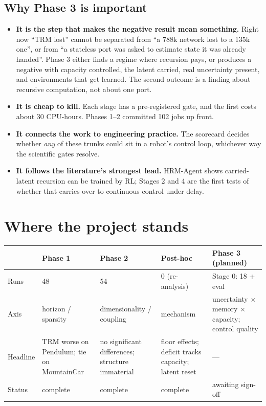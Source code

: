 \documentclass[11pt]{article}
\begin{document}
\subsection{Why Phase 3 is important}
\begin{itemize}
  \item \textbf{It is the step that makes the negative result mean something.} Right now ``TRM lost'' cannot be separated from ``a 788k network lost to a 135k one'', or from ``a stateless port was asked to estimate state it was already handed''. Phase 3 either finds a regime where recursion pays, or produces a negative with capacity controlled, the latent carried, real uncertainty present, and environments that get learned. The second outcome is a finding about recursive computation, not about one port.
  \item \textbf{It is cheap to kill.} Each stage has a pre-registered gate, and the first costs about 30 CPU-hours. Phases 1--2 committed 102 jobs up front.
  \item \textbf{It connects the work to engineering practice.} The scorecard decides whether \emph{any} of these trunks could sit in a robot's control loop, whichever way the scientific gates resolve.
  \item \textbf{It follows the literature's strongest lead.} HRM-Agent shows carried-latent recursion can be trained by RL; Stages 2 and 4 are the first tests of whether that carries over to continuous control under delay.
\end{itemize}

\section{Where the project stands}
\begin{table}[H]
\centering\small
\begin{tabularx}{\textwidth}{lYYYY}
\toprule
 & Phase 1 & Phase 2 & Post-hoc & Phase 3 (planned) \\
\midrule
Runs & 48 & 54 & 0 (re-analysis) & Stage 0: 18 + eval \\
Axis & horizon / sparsity & dimensionality / coupling & mechanism & uncertainty $\times$ memory $\times$ capacity; control quality \\
Headline & TRM worse on Pendulum; tie on MountainCar & no significant differences; structure immaterial & floor effects; deficit tracks capacity; latent reset & --- \\
Status & complete & complete & complete & awaiting sign-off \\
\bottomrule
\end{tabularx}
\end{table}
\end{document}
